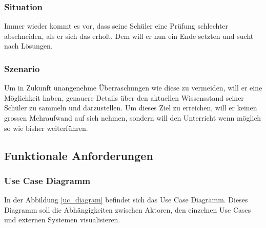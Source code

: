 \subsubsection*{Situation}
Immer wieder kommt es vor, dass seine Schüler eine Prüfung schlechter abschneiden, als er sich das erholt. Dem will er nun ein Ende setzten und sucht nach Lösungen.

\subsubsection*{Szenario}
Um in Zukunft unangenehme Überraschungen wie diese zu vermeiden, will er eine Möglichkeit haben, genauere Details über den aktuellen Wissensstand seiner Schüler zu sammeln und darzustellen. Um dieses Ziel zu erreichen, will er keinen grossen Mehraufwand auf sich nehmen, sondern will den Unterricht wenn möglich so wie bisher weiterführen.


\subsection{Funktionale Anforderungen}

\subsubsection{Use Case Diagramm}
In der Abbildung \ref{uc_diagram} befindet sich das Use Case Diagramm. Dieses Diagramm soll die Abhängigkeiten zwischen Aktoren, den einzelnen Use Cases und externen Systemen visualisieren.

